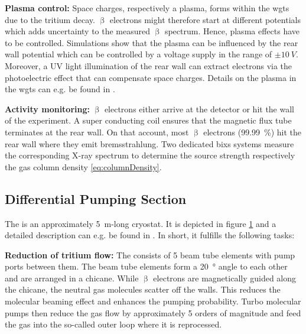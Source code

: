 {\par\textbf{Plasma control:}
Space charges, respectively a plasma, forms within the \gls{wgts} due to the tritium decay. $\upbeta$ electrons might therefore start at different potentials which adds uncertainty to the measured $\upbeta$ spectrum. Hence, plasma effects have to be controlled. Simulations show that the plasma can be influenced by the rear wall potential which can be controlled by a voltage supply in the range of $\pm \SI{10}{V}$. Moreover, a UV light illumination of the rear wall can extract electrons via the photoelectric effect that can compensate space charges. Details on the plasma in the \gls{wgts} can e.g. be found in \cite{Kuckert2018}.}

{\par\textbf{Activity monitoring:}
$\upbeta$ electrons either arrive at the detector or hit the wall of the experiment. A super conducting coil ensures that the magnetic flux tube terminates at the rear wall. On that account, most $\upbeta$ electrons (\SI{99.99}{\percent}) hit the rear wall where they emit bremsstrahlung. Two dedicated \gls{bixs} systems measure the corresponding X-ray spectrum to determine the source strength respectively the gas column density \eqref{eq:columnDensity}.}

\subsection{Differential Pumping Section}
\label{sec:diffPumpingSection}
\begin{figure}[t]
 \label{fig:dps}
\end{figure}
The  is an approximately \SI{5}{m}-long cryostat. It is depicted in figure \ref{fig:dps} and a detailed description can e.g. be found in \cite{Kosmider2012}. In short, it fulfills the following tasks:

{\par\textbf{Reduction of tritium flow:}
The  consists of 5 beam tube elements with pump ports between them. The beam tube elements form a \SI{20}{\degree} angle to each other and are arranged in a chicane. While $\upbeta$ electrons are magnetically guided along the chicane, the neutral gas molecules scatter off the walls. This reduces the molecular beaming effect and enhances the pumping probability. Turbo molecular pumps then reduce the gas flow by approximately 5 orders of magnitude and feed the gas into the so-called outer loop where it is reprocessed.}

